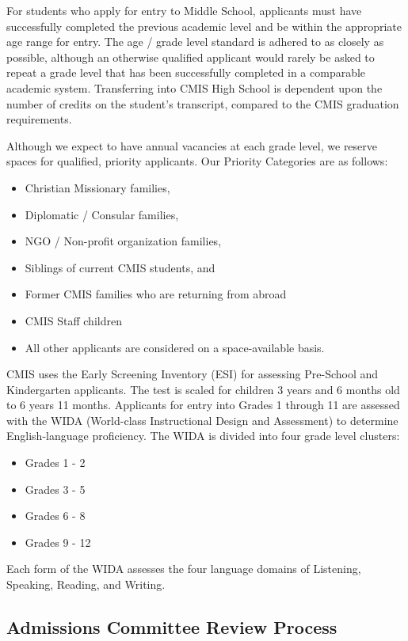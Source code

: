 \documentclass{report}
\begin{document}
For students who apply for entry to Middle School, applicants must have successfully completed the previous academic level and be within the appropriate age range for entry.  The age / grade level standard is adhered to as closely as possible, although an otherwise qualified applicant would rarely be asked to repeat a grade level that has been successfully completed in a comparable academic system.  Transferring into CMIS High School is dependent upon the number of credits on the student's transcript, compared to the CMIS graduation requirements.

Although we expect to have annual vacancies at each grade level, we reserve spaces for qualified, priority applicants.  Our Priority Categories are as follows: 
\begin{itemize} 
\item Christian Missionary families,
\item Diplomatic / Consular families,
\item NGO / Non-profit organization families,
\item Siblings of current CMIS students, and
\item Former CMIS families who are returning from abroad
\item CMIS Staff children
\item All other applicants are considered on a space-available basis.
\end{itemize}

CMIS uses the Early Screening Inventory (ESI) for assessing Pre-School and Kindergarten applicants.  The test is scaled for children 3 years and 6 months old to 6 years 11 months.  Applicants for entry into Grades 1 through 11 are assessed with the WIDA (World-class Instructional Design and Assessment) to determine English-language proficiency.  The WIDA is divided into four grade level clusters:

\begin{itemize}
\item Grades 1 - 2
\item Grades 3 - 5
\item Grades 6 - 8
\item Grades 9 - 12
\end{itemize}

Each form of the WIDA assesses the four language domains of Listening, Speaking, Reading, and Writing.  

\subsection{Admissions Committee Review Process}
\end{document}
